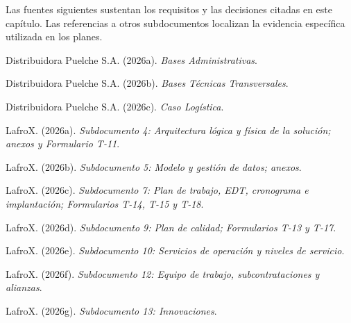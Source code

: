 
Las fuentes siguientes sustentan los requisitos y las decisiones citadas en este capítulo. Las referencias a otros subdocumentos localizan la evidencia específica utilizada en los planes.

\begingroup
\raggedright
\setlength{\parindent}{0pt}
\setlength{\parskip}{7pt}
\newcommand{\refdonce}[1]{\par\noindent\hangindent=1.27cm #1\par}
\refdonce{Distribuidora Puelche S.A. (2026a). \emph{Bases Administrativas}.}
\refdonce{Distribuidora Puelche S.A. (2026b). \emph{Bases Técnicas Transversales}.}
\refdonce{Distribuidora Puelche S.A. (2026c). \emph{Caso Logística}.}
\refdonce{LafroX. (2026a). \emph{Subdocumento 4: Arquitectura lógica y física de la solución; anexos y Formulario T-11}.}
\refdonce{LafroX. (2026b). \emph{Subdocumento 5: Modelo y gestión de datos; anexos}.}
\refdonce{LafroX. (2026c). \emph{Subdocumento 7: Plan de trabajo, EDT, cronograma e implantación; Formularios T-14, T-15 y T-18}.}
\refdonce{LafroX. (2026d). \emph{Subdocumento 9: Plan de calidad; Formularios T-13 y T-17}.}
\refdonce{LafroX. (2026e). \emph{Subdocumento 10: Servicios de operación y niveles de servicio}.}
\refdonce{LafroX. (2026f). \emph{Subdocumento 12: Equipo de trabajo, subcontrataciones y alianzas}.}
\refdonce{LafroX. (2026g). \emph{Subdocumento 13: Innovaciones}.}
\endgroup

